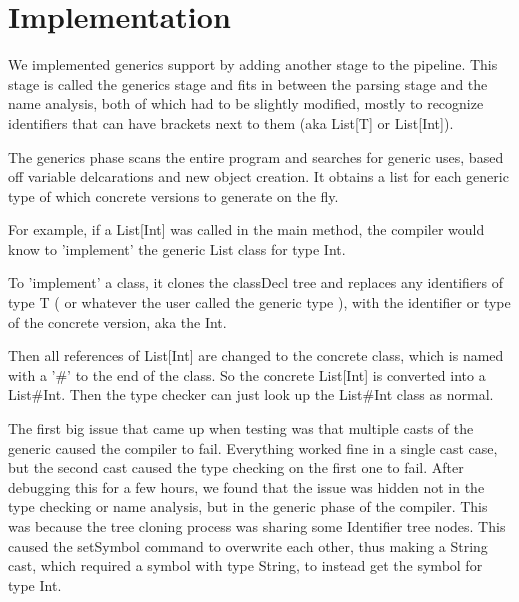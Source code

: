 \documentclass[nocopyrightspace,11pt,authoryear,preprint]{sigplanconf}
\begin{document}
\section{Implementation}



We implemented generics support by adding another stage to the pipeline.
This stage is called the generics stage and fits in between the parsing stage
and the name analysis, both of which had to be slightly modified, mostly
to recognize identifiers that can have brackets next to them (aka List[T] or
List[Int]).

The generics phase scans the entire program and searches for generic uses,
based off variable delcarations and new object creation.  It obtains a list
for each generic type of which concrete versions to generate on the fly.

For example, if a List[Int] was called in the main method, the compiler
would know to 'implement' the generic List class for type Int.

To 'implement' a class, it clones the classDecl tree and replaces any 
identifiers of type T ( or whatever the user called the generic type ),
with the identifier or type of the concrete version, aka the Int.

Then all references of List[Int] are changed to the concrete class, which
is named with a '\#' to the end of the class. So the concrete List[Int] is
converted into a List\#Int.  Then the type checker can just look up the 
List\#Int class as normal.

The first big issue that came up when testing was that multiple casts of the
generic caused the compiler to fail.  Everything worked fine in a single
cast case, but the second cast caused the type checking on the first one to fail.
After debugging this for a few hours, we found that the issue was hidden not
in the type checking or name analysis, but in the generic phase of the compiler.
This was because the tree cloning process was sharing some Identifier tree nodes.
This caused the setSymbol command to overwrite each other, thus making a String cast,
which required a symbol with type String, to instead get the symbol for type Int.
\end{document}
